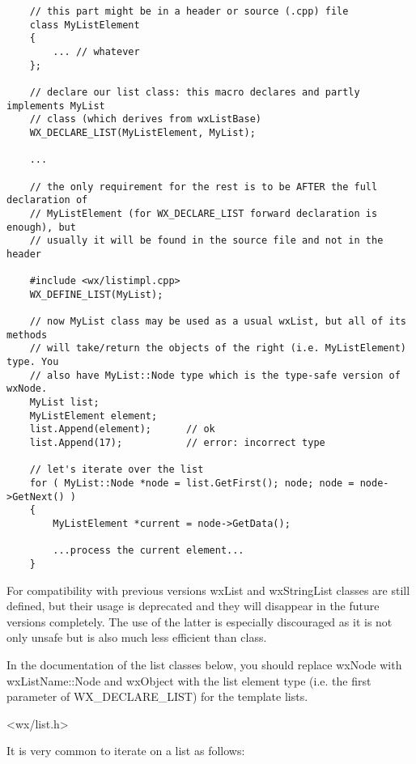 \begin{verbatim}
    // this part might be in a header or source (.cpp) file
    class MyListElement
    {
        ... // whatever
    };

    // declare our list class: this macro declares and partly implements MyList
    // class (which derives from wxListBase)
    WX_DECLARE_LIST(MyListElement, MyList);

    ...

    // the only requirement for the rest is to be AFTER the full declaration of
    // MyListElement (for WX_DECLARE_LIST forward declaration is enough), but
    // usually it will be found in the source file and not in the header

    #include <wx/listimpl.cpp>
    WX_DEFINE_LIST(MyList);

    // now MyList class may be used as a usual wxList, but all of its methods
    // will take/return the objects of the right (i.e. MyListElement) type. You
    // also have MyList::Node type which is the type-safe version of wxNode.
    MyList list;
    MyListElement element;
    list.Append(element);      // ok
    list.Append(17);           // error: incorrect type

    // let's iterate over the list
    for ( MyList::Node *node = list.GetFirst(); node; node = node->GetNext() )
    {
        MyListElement *current = node->GetData();

        ...process the current element...
    }
\end{verbatim}

For compatibility with previous versions wxList and wxStringList classes are
still defined, but their usage is deprecated and they will disappear in the
future versions completely. The use of the latter is especially discouraged as
it is not only unsafe but is also much less efficient than 
 class.

In the documentation of the list classes below, you should replace wxNode with
wxListName::Node and wxObject with the list element type (i.e. the first
parameter of WX\_DECLARE\_LIST) for the template lists.




<wx/list.h>


It is very common to iterate on a list as follows:

